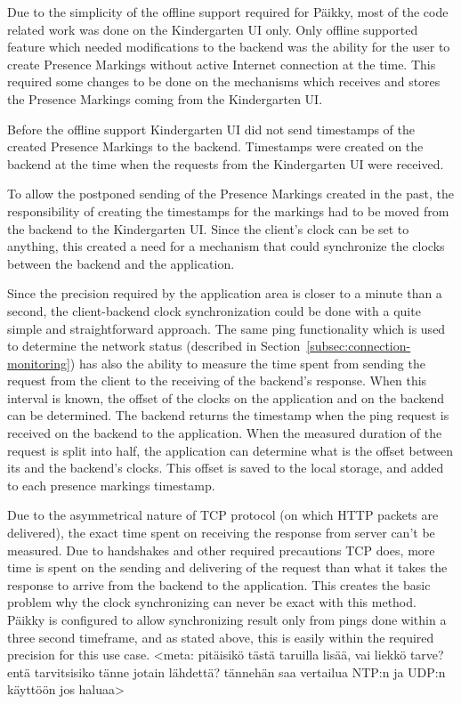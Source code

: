 Due to the simplicity of the offline support required for Päikky, most of the code related work was done on the Kindergarten UI only. Only offline supported feature which needed modifications to the backend was the ability for the user to create Presence Markings without active Internet connection at the time. This required some changes to be done on the mechanisms which receives and stores the Presence Markings coming from the Kindergarten UI. 

Before the offline support Kindergarten UI did not send timestamps of the created Presence Markings to the backend. Timestamps were created on the backend at the time when the requests from the Kindergarten UI were received. 

To allow the postponed sending of the Presence Markings created in the past, the responsibility of creating the timestamps for the markings had to be moved from the backend to the Kindergarten UI. Since the client's clock can be set to anything, this created a need for a mechanism that could synchronize the clocks between the backend and the application.

Since the precision required by the application area is closer to a minute than a second, the client-backend clock synchronization could be done with a quite simple and straightforward approach. The same ping functionality which is used to determine the network status (described in Section~\ref{subsec:connection-monitoring}) has also the ability to measure the time spent from sending the request from the client to the receiving of the backend's response. When this interval is known, the offset of the clocks on the application and on the backend can be determined. The backend returns the timestamp when the ping request is received on the backend to the application. When the measured duration of the request is split into half, the application can determine what is the offset between its and the backend's clocks. This offset is saved to the local storage, and added to each presence markings timestamp. 


Due to the asymmetrical nature of TCP protocol (on which HTTP packets are delivered), the exact time spent on receiving the response from server can't be measured. Due to handshakes and other required precautions TCP does, more time is spent on the sending and delivering of the request than what it takes the response to arrive from the backend to the application. This creates the basic problem why the clock synchronizing can never be exact with this method. Päikky is configured to allow synchronizing result only from pings done within a three second timeframe, and as stated above, this is easily within the required precision for this use case. <meta: pitäisikö tästä taruilla lisää, vai liekkö tarve? entä tarvitsisiko tänne jotain lähdettä? tännehän saa vertailua NTP:n ja UDP:n käyttöön jos haluaa>






